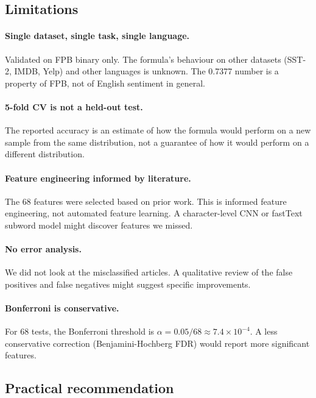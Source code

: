 \documentclass{article}
\begin{document}
\subsection{Limitations}

\paragraph{Single dataset, single task, single language.}
Validated on FPB binary only. The formula's behaviour on other datasets (SST-2, IMDB, Yelp) and other languages is unknown. The 0.7377 number is a property of FPB, not of English sentiment in general.

\paragraph{5-fold CV is not a held-out test.}
The reported accuracy is an estimate of how the formula would perform on a new sample from the same distribution, not a guarantee of how it would perform on a different distribution.

\paragraph{Feature engineering informed by literature.}
The 68 features were selected based on prior work. This is informed feature engineering, not automated feature learning. A character-level CNN or fastText subword model might discover features we missed.

\paragraph{No error analysis.}
We did not look at the misclassified articles. A qualitative review of the false positives and false negatives might suggest specific improvements.

\paragraph{Bonferroni is conservative.}
For 68 tests, the Bonferroni threshold is $\alpha = 0.05/68 \approx 7.4 \times 10^{-4}$. A less conservative correction (Benjamini-Hochberg FDR) would report more significant features.

\subsection{Practical recommendation}
\end{document}
